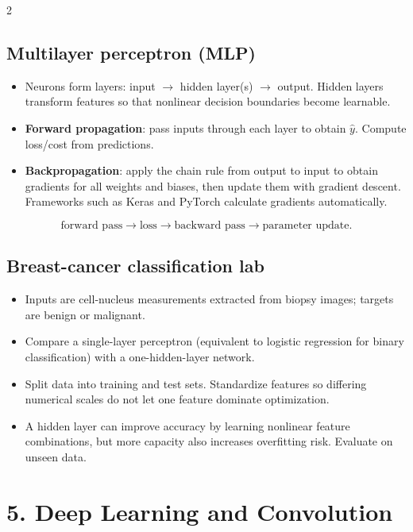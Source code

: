 \documentclass[10pt,a4paper]{ctexart}
\newcommand{\key}[1]{\textbf{#1}}
\newcommand{\formula}[1]{%
  \par\vspace{1pt}\begingroup
  \setlength{\abovedisplayskip}{0pt}\setlength{\belowdisplayskip}{0pt}
  \[ #1 \]\endgroup\vspace{1pt}}
\begin{document}
\begin{multicols*}{2}
\subsection{Multilayer perceptron (MLP)}
\begin{itemize}
  \item Neurons form layers: input \(\rightarrow\) hidden layer(s) \(\rightarrow\) output. Hidden layers transform features so that nonlinear decision boundaries become learnable.
  \item \key{Forward propagation}: pass inputs through each layer to obtain \(\hat y\). Compute loss/cost from predictions.
  \item \key{Backpropagation}: apply the chain rule from output to input to obtain gradients for all weights and biases, then update them with gradient descent. Frameworks such as Keras and PyTorch calculate gradients automatically.
\end{itemize}
\formula{\text{forward pass}\rightarrow\text{loss}\rightarrow\text{backward pass}\rightarrow\text{parameter update}.}

\subsection{Breast-cancer classification lab}
\begin{itemize}
  \item Inputs are cell-nucleus measurements extracted from biopsy images; targets are benign or malignant.
  \item Compare a single-layer perceptron (equivalent to logistic regression for binary classification) with a one-hidden-layer network.
  \item Split data into training and test sets. Standardize features so differing numerical scales do not let one feature dominate optimization.
  \item A hidden layer can improve accuracy by learning nonlinear feature combinations, but more capacity also increases overfitting risk. Evaluate on unseen data.
\end{itemize}


\section{5. Deep Learning and Convolution}

\end{multicols*}
\end{document}
